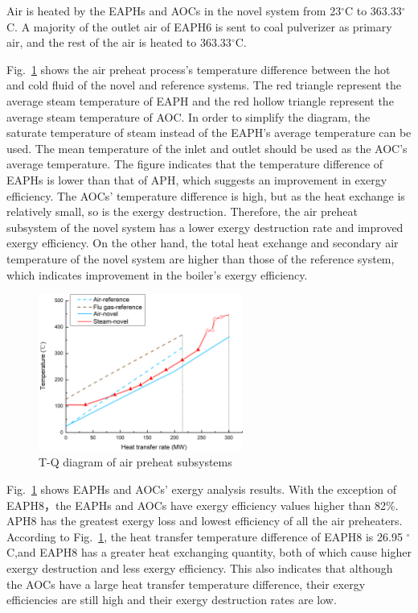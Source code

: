 \documentclass[preprint,12pt]{elsarticle}
\begin{document}
Air is heated by the EAPHs and AOCs in the novel system from 23$^\circ$C to 363.33$^\circ$C. 
A majority of the outlet air of EAPH6 is sent to coal pulverizer as primary air, and the rest of the air is heated to 363.33$^\circ$C. 

Fig.~\ref{fig:APH_temper_compare} shows the air preheat process's temperature difference between the hot and cold fluid of the novel and reference systems.
The red triangle represent the average steam temperature of EAPH and the red hollow triangle represent the average steam temperature of AOC.
In order to simplify the diagram, the saturate temperature of steam instead of the EAPH's average temperature can be used. The mean temperature of the inlet and outlet should be used as the AOC's average temperature.
The figure indicates that the temperature difference of EAPHs is lower than that of APH, which suggests an improvement in exergy efficiency.
The AOCs' temperature difference is high, but as the heat exchange is relatively small, so is the exergy destruction. 
Therefore, the air preheat subsystem of the novel system has a lower exergy destruction rate and improved exergy efficiency.
On the other hand, the total heat exchange and secondary air temperature of the novel system are higher than those of the reference system, which indicates improvement in the boiler's exergy efficiency.

\begin{figure}[htbp]
\centering
\includegraphics[width=0.6\textwidth]{fig/APH_temper_compare.png}
\caption{T-Q diagram of air preheat subsystems} 
\label{fig:APH_temper_compare}
\end{figure}


Fig.~\ref{fig:APH_temper_compare} shows EAPHs and AOCs' exergy analysis results. 
With the exception of EAPH8，the EAPHs and AOCs have exergy efficiency values higher than 82\%. APH8 has the greatest exergy loss and lowest efficiency of all the air preheaters. 
According to Fig.~\ref{fig:APH_temper_compare}, the heat transfer temperature difference of EAPH8 is 26.95 $^\circ$C,and EAPH8 has a greater heat exchanging quantity, both of which cause higher exergy destruction and less exergy efficiency.
This also indicates that although the AOCs have a large heat transfer temperature difference, their exergy efficiencies are still high and their exergy destruction rates are low.
\end{document}
